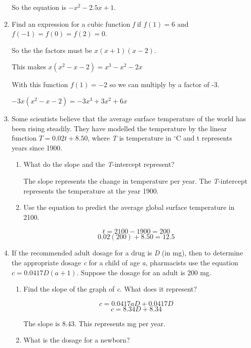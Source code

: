 \documentclass{article}
\begin{document}
\begin{enumerate}
			So the equation is $-x^2 - 2.5x + 1$.
			
		\item Find an expression for a cubic function \emph{f} if $f(1) = 6$ and $f(-1) = f(0) = f(2) = 0$.
		
			So the the factors must be $x(x + 1)(x-2)$.
			
			This makes $x(x^2 - x - 2) = x^3 - x^2 - 2x$
			
			With this function $f(1) = -2$ so we can multiply by a factor of -3.
			
			$-3x(x^2 - x - 2) = -3x^3 + 3x^2 + 6x$
			
		\item Some scientists believe that the average surface temperature of the world has been rising
			steadily. They have modelled the temperature by the linear function $T = 0.02t + 8.50$,
			where \emph{T} is temperature in $^{\circ}$C and t represents years since 1900.
			
			\begin{enumerate}
				\item What do the slope and the \emph{T}-intercept represent?
				
					The slope represents the change in temperature per year. The \emph{T}-intercept
					represents the temperature at the year 1900.
					
				\item Use the equation to predict the average global surface temperature in 2100.
				
					$$t = 2100 - 1900 = 200$$
					$$0.02(200) + 8.50 = 12.5$$
				
			\end{enumerate}
			
		\item If the recommended adult dosage for a drug is \emph{D} (in mg), then to determine the appropriate
			dosage \emph{c} for a child of age \emph{a}, pharmacists use the equation $c = 0.0417D(a + 1)$.
			Suppose the dosage for an adult is 200 mg.
			
			\begin{enumerate}
				\item Find the slope of the graph of \emph{c}. What does it represent?
				
				$$c = 0.0417aD + 0.0417D$$
				$$c = 8.34D + 8.34$$
				
				The slope is 8.43. This represents mg per year.
				
				\item What is the dosage for a newborn?
				

\end{enumerate}
\end{enumerate}
\end{document}
